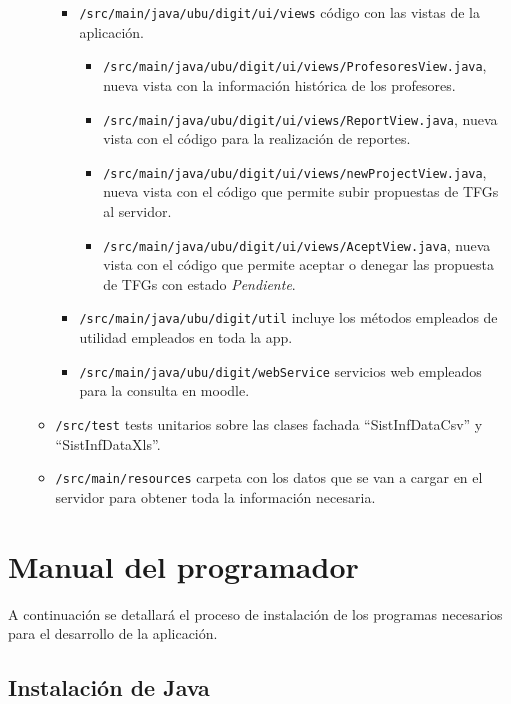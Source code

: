 \begin{itemize}
\begin{itemize}
\begin{itemize}
				\item \texttt{/src/main/java/ubu/digit/ui/views} código con las vistas de la aplicación.
					\begin{itemize}
						\item \texttt{/src/main/java/ubu/digit/ui/views/ProfesoresView.java}, nueva vista con la información histórica de los profesores.
						\item \texttt{/src/main/java/ubu/digit/ui/views/ReportView.java}, nueva vista con el código para la realización de reportes.
						\item \texttt{/src/main/java/ubu/digit/ui/views/newProjectView.java}, nueva vista con el código que permite subir propuestas de TFGs al servidor.
						\item \texttt{/src/main/java/ubu/digit/ui/views/AceptView.java}, nueva vista con el código que permite aceptar o denegar las propuesta de TFGs con estado \emph{Pendiente}.
					\end{itemize}
				\item \texttt{/src/main/java/ubu/digit/util} incluye los métodos empleados de utilidad empleados en toda la app. 
				\item \texttt{/src/main/java/ubu/digit/webService} servicios web empleados para la consulta en moodle.
			\end{itemize}
			
			\item \texttt{/src/test} tests unitarios sobre las clases fachada “SistInfDataCsv” y “SistInfDataXls”.
			
			\item \texttt{/src/main/resources} carpeta con los datos que se van a cargar en el servidor para obtener toda la información necesaria.
		\end{itemize}
	
\end{itemize}
			
\section{Manual del programador}

A continuación se detallará el proceso de instalación de los programas
necesarios para el desarrollo de la aplicación.

\subsection{Instalación de Java}

